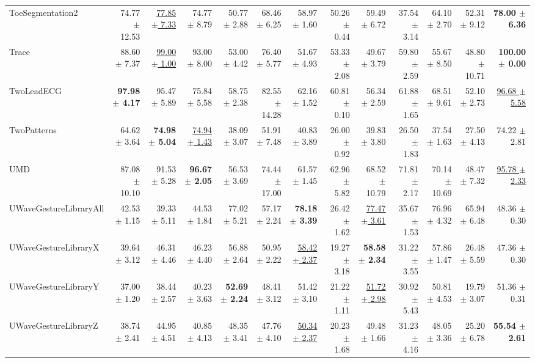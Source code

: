 \begin{landscape}
\begin{longtable}{lrrrrrrrrrrrr}
ToeSegmentation2 & 74.77 $\pm$ 12.53 & \underline{77.85 $\pm$ 7.33} & 74.77 $\pm$ 8.79 & 50.77 $\pm$ 2.88 & 68.46 $\pm$ 6.25 & 58.97 $\pm$ 1.60 & 50.26 $\pm$ 0.44 & 59.49 $\pm$ 6.72 & 37.54 $\pm$ 3.14 & 64.10 $\pm$ 2.70 & 52.31 $\pm$ 9.12 & \textbf{78.00 $\pm$ 6.36} \\
Trace & 88.60 $\pm$ 7.37 & \underline{99.00 $\pm$ 1.00} & 93.00 $\pm$ 8.00 & 53.00 $\pm$ 4.42 & 76.40 $\pm$ 5.77 & 51.67 $\pm$ 4.93 & 53.33 $\pm$ 2.08 & 49.67 $\pm$ 3.79 & 59.80 $\pm$ 2.59 & 55.67 $\pm$ 8.50 & 48.80 $\pm$ 10.71 & \textbf{100.00 $\pm$ 0.00} \\
TwoLeadECG & \textbf{97.98 $\pm$ 4.17} & 95.47 $\pm$ 5.89 & 75.84 $\pm$ 5.58 & 58.75 $\pm$ 2.38 & 82.55 $\pm$ 14.28 & 62.16 $\pm$ 1.52 & 60.81 $\pm$ 0.10 & 56.34 $\pm$ 2.59 & 61.88 $\pm$ 1.65 & 68.51 $\pm$ 9.61 & 52.10 $\pm$ 2.73 & \underline{96.68 $\pm$ 5.58} \\
TwoPatterns & 64.62 $\pm$ 3.64 & \textbf{74.98 $\pm$ 5.04} & \underline{74.94 $\pm$ 1.43} & 38.09 $\pm$ 3.07 & 51.91 $\pm$ 7.48 & 40.83 $\pm$ 3.89 & 26.00 $\pm$ 0.92 & 39.83 $\pm$ 3.80 & 26.50 $\pm$ 1.83 & 37.54 $\pm$ 1.63 & 27.50 $\pm$ 4.13 & 74.22 $\pm$ 2.81 \\
UMD & 87.08 $\pm$ 10.10 & 91.53 $\pm$ 5.28 & \textbf{96.67 $\pm$ 2.05} & 56.53 $\pm$ 3.69 & 74.44 $\pm$ 17.00 & 61.57 $\pm$ 1.45 & 62.96 $\pm$ 5.82 & 68.52 $\pm$ 10.79 & 71.81 $\pm$ 2.17 & 70.14 $\pm$ 10.69 & 48.47 $\pm$ 7.32 & \underline{95.78 $\pm$ 2.33} \\
UWaveGestureLibraryAll & 42.53 $\pm$ 1.15 & 39.33 $\pm$ 5.11 & 44.53 $\pm$ 1.84 & 77.02 $\pm$ 5.21 & 57.17 $\pm$ 2.24 & \textbf{78.18 $\pm$ 3.39} & 26.42 $\pm$ 1.62 & \underline{77.47 $\pm$ 3.61} & 35.67 $\pm$ 1.53 & 76.96 $\pm$ 4.32 & 65.94 $\pm$ 6.48 & 48.36 $\pm$ 0.30 \\
UWaveGestureLibraryX & 39.64 $\pm$ 3.12 & 46.31 $\pm$ 4.46 & 46.23 $\pm$ 4.40 & 56.88 $\pm$ 2.64 & 50.95 $\pm$ 2.22 & \underline{58.42 $\pm$ 2.37} & 19.27 $\pm$ 3.18 & \textbf{58.58 $\pm$ 2.34} & 31.22 $\pm$ 3.55 & 57.86 $\pm$ 1.47 & 26.48 $\pm$ 5.59 & 47.36 $\pm$ 0.30 \\
UWaveGestureLibraryY & 37.00 $\pm$ 1.20 & 38.44 $\pm$ 2.57 & 40.23 $\pm$ 3.63 & \textbf{52.69 $\pm$ 2.24} & 48.41 $\pm$ 3.12 & 51.42 $\pm$ 3.10 & 21.22 $\pm$ 1.11 & \underline{51.72 $\pm$ 2.98} & 30.92 $\pm$ 5.43 & 50.81 $\pm$ 4.53 & 19.79 $\pm$ 3.07 & 51.36 $\pm$ 0.31 \\
UWaveGestureLibraryZ & 38.74 $\pm$ 2.41 & 44.95 $\pm$ 4.51 & 40.85 $\pm$ 4.13 & 48.35 $\pm$ 3.41 & 47.76 $\pm$ 4.10 & \underline{50.34 $\pm$ 2.37} & 20.23 $\pm$ 1.68 & 49.48 $\pm$ 1.66 & 31.23 $\pm$ 4.16 & 48.05 $\pm$ 3.36 & 25.20 $\pm$ 6.78 & \textbf{55.54 $\pm$ 2.61} \\

\end{longtable}
\end{landscape}

